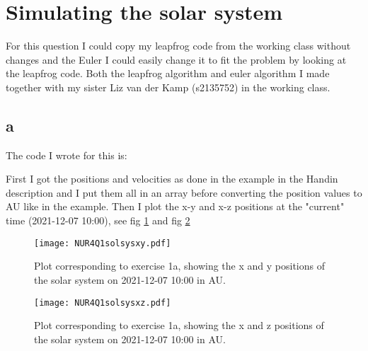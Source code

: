 \section{Simulating the solar system}

For this question I could copy my leapfrog code from the working class without changes and the Euler I could easily change it to fit the problem by looking at the leapfrog code. 
Both the leapfrog algorithm and euler algorithm I made together with my sister Liz van der Kamp (s2135752) in the working class. 

\subsection*{a}

The code I wrote for this is:


First I got the positions and velocities as done in the example in the Handin description and I put them all in an array before converting the position values to AU like in the example. Then I plot the x-y and x-z positions at the "current" time (2021-12-07 10:00), see fig \ref{fig:fig1} and fig \ref{fig:fig2}

\begin{figure}[h!]
  \centering
  \texttt{[image: NUR4Q1solsysxy.pdf]}
  \caption{Plot corresponding to exercise 1a, showing  the x and y positions of the solar system on 2021-12-07 10:00 in AU.}
  \label{fig:fig1}
\end{figure} 


\begin{figure}[h!]
  \centering
  \texttt{[image: NUR4Q1solsysxz.pdf]}
  \caption{Plot corresponding to exercise 1a, showing  the x and z positions of the solar system on 2021-12-07 10:00 in AU.}
  \label{fig:fig2}
\end{figure} 
